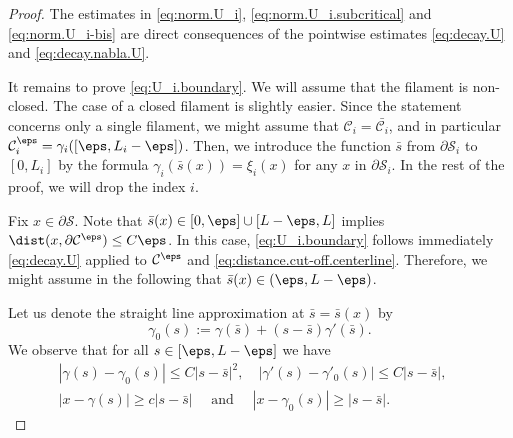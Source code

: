 \begin{proof}
The estimates in \eqref{eq:norm.U_i}, \eqref{eq:norm.U_i.subcritical} {and \eqref{eq:norm.U_i-bis}} are direct consequences of the pointwise estimates \eqref{eq:decay.U} {and} \eqref{eq:decay.nabla.U}.

It remains to prove \eqref{eq:U_i.boundary}.
We will assume that the filament is non-closed. The case of a closed filament is slightly easier.
{Since the statement concerns only a single filament, we might assume that $\mathcal C_i = \bar {\mathcal C_i}$, and in particular $\mathcal C_i^\eps = \gamma_i([\eps,L_i - \eps])$.
Then, we introduce the function $\bar s$ from $\partial \mathcal S_i$ to $[0,L_i]$
by the formula $\gamma_i (\bar s (x)) = \xi_i(x)$ for any $x$ in $\partial \mathcal S_i$.}
In the rest of the proof, we will drop the index $i$.

{Fix $x \in \partial \mathcal S$. Note that $\bar s (x) \in [0,\eps] \cup [L - \eps, L]$ implies
$\dist(x, \partial \mathcal C^\eps) \leq C \eps$. In this case, \eqref{eq:U_i.boundary} follows immediately \eqref{eq:decay.U} applied to $\mathcal C^\eps$ and \eqref{eq:distance.cut-off.centerline}.
Therefore, we might assume in the following that $\bar s (x) \in (\eps,L - \eps)$.}

Let us denote the straight line
approximation at $\bar s = \bar s(x)$ by
\[
\gamma_0(s) := \gamma(\bar s) + (s - \bar s) \gamma'(\bar s).\]
We observe that for all $s \in [\eps,L - \eps]$ we have
\begin{gather}
\label{ob1}
|\gamma(s) - \gamma_0(s)| \leq C |s - \bar s|^2, \quad
|\gamma'(s) - \gamma'_0(s)| \leq C |s - \bar s|, \quad \\
\label{ob2}
|x-\gamma(s)| \geq c |s - \bar s| \quad \text{ and } \quad |x-\gamma_0(s)| \geq |s - \bar s|.
\end{gather}


\end{proof}
